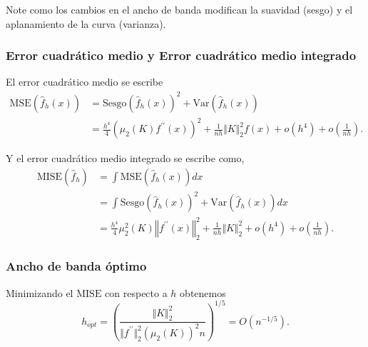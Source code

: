 \documentclass[12pt]{book}\usepackage[]{graphicx}\usepackage[]{color}
\theoremstyle{definition}
\theoremstyle{plain}
\begin{document}


\begin{nota}{}{}
	Note como los cambios en el ancho de banda modifican la suavidad (sesgo) y el aplanamiento de la curva (varianza).
\end{nota}

\newpage

\subsubsection{Error cuadrático medio y Error cuadrático medio integrado}

El error cuadrático medio se escribe
\begin{align*}
	\mathrm{MSE}(\hat{f}_{h}(x))
	  & = \mathrm{Sesgo}\left(\hat{f}_{h}(x)\right)^{2} + \mathrm{Var}\left(\hat{f}_{h}(x)\right)                                                 \\
	  & = \frac{h^{4}}{4}\left(\mu_{2}(K)f^{\prime\prime}(x)\right)^{2}+\frac{1}{nh}\Vert K\Vert_{2}^{2}f(x)+o(h^{4})+o\left(\frac{1}{nh}\right).
\end{align*}

Y el error cuadrático medio integrado se escribe como,
\begin{align*}
	\mathrm{MISE}\left(\hat{f}_{h}\right) & = \int \mathrm{MSE}\left(\hat{f}_{h}(x)\right)dx                                                                                                        \\
	                                      & = \int \mathrm{Sesgo}\left(\hat{f}_{h}(x)\right)^{2} + \mathrm{Var}\left(\hat{f}_{h}(x)\right)dx                                                        \\
	                                      & = \frac{h^{4}}{4}\mu_{2}^{2}(K)\left\Vert f^{\prime\prime}(x)\right\Vert_{2}^{2} +\frac{1}{nh}\Vert K\Vert_{2}^{2}+o(h^{4})+o\left(\frac{1}{nh}\right).
\end{align*}
\newpage
\subsubsection{Ancho de banda óptimo}

Minimizando el \(\mathrm{MISE}\) con respecto a \(h\) obtenemos
\begin{equation*}
	h_{opt}=\left(\frac{\Vert K\Vert_{2}^{2}}{\Vert f^{\prime\prime}\Vert_{2}^{2}\left(\mu_{2}(K)\right)^{2}n}\right)^{1/5}=O\left( n^{-1/5} \right).
\end{equation*}
\end{document}
